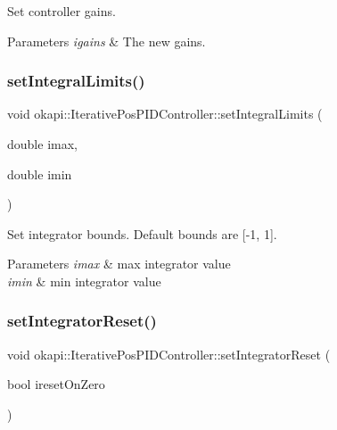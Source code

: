 Set controller gains.


\begin{DoxyParams}{Parameters}
{\em igains} & The new gains. \\
\hline
\end{DoxyParams}
\mbox{\label{classokapi_1_1IterativePosPIDController_a65dd3f1eb00a526ec191d80ec282f4ae}} 
\subsubsection{\texorpdfstring{setIntegralLimits()}{setIntegralLimits()}}
{\footnotesize\ttfamily void okapi\+::\+Iterative\+Pos\+P\+I\+D\+Controller\+::set\+Integral\+Limits (\begin{DoxyParamCaption}\item[{double}]{imax,  }\item[{double}]{imin }\end{DoxyParamCaption})\hspace{0.3cm}{\ttfamily [virtual]}}

Set integrator bounds. Default bounds are \mbox{[}-\/1, 1\mbox{]}.


\begin{DoxyParams}{Parameters}
{\em imax} & max integrator value \\
\hline
{\em imin} & min integrator value \\
\hline
\end{DoxyParams}
\mbox{\label{classokapi_1_1IterativePosPIDController_afa74b0883996ed60c5d7b0090c1acae1}} 
\subsubsection{\texorpdfstring{setIntegratorReset()}{setIntegratorReset()}}
{\footnotesize\ttfamily void okapi\+::\+Iterative\+Pos\+P\+I\+D\+Controller\+::set\+Integrator\+Reset (\begin{DoxyParamCaption}\item[{bool}]{ireset\+On\+Zero }\end{DoxyParamCaption})\hspace{0.3cm}{\ttfamily [virtual]}}

